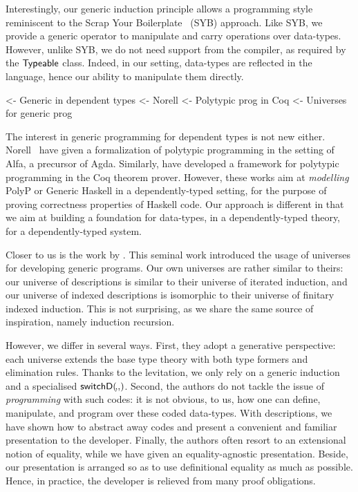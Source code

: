 Interestingly, our generic induction principle allows a programming
style reminiscent to the Scrap Your Boilerplate~\cite{spj:syb} (SYB)
approach. Like SYB, we provide a generic operator to manipulate and
carry operations over data-types. However, unlike SYB, we do not need
support from the compiler, as required by the $\textsf{Typeable}$
class. Indeed, in our setting, data-types are reflected in the
language, hence our ability to manipulate them directly.

\begin{wstructure}
    <- Generic in dependent types
        <- Norell \cite{norell:msc-thesis}
        <- Polytypic prog in Coq \cite{verbruggen:polytype-coq}
        <- Universes for generic prog \cite{benke:universe-generic-prog}
\end{wstructure}

The interest in generic programming for dependent types is not new
either. Norell~\cite{norell:msc-thesis} have given a formalization of
polytypic programming in the setting of Alfa, a precursor of
Agda. Similarly, \citet{verbruggen:polytype-prog-coq,
  verbruggen:polytype-coq} have developed a framework for polytypic
programming in the Coq theorem prover. However, these works aim at
\emph{modelling} PolyP or Generic Haskell in a dependently-typed
setting, for the purpose of proving correctness properties of Haskell
code. Our approach is different in that we aim at building a
foundation for data-types, in a dependently-typed theory, for a
dependently-typed system.

Closer to us is the work by \citet{benke:universe-generic-prog}. This
seminal work introduced the usage of universes for developing generic
programs. Our own universes are rather similar to theirs: our universe
of descriptions is similar to their universe of iterated induction,
and our universe of indexed descriptions is isomorphic to their
universe of finitary indexed induction. This is not surprising, as we
share the same source of inspiration, namely induction recursion.

However, we differ in several ways. First, they adopt a generative
perspective: each universe extends the base type theory with both type
formers and elimination rules. Thanks to the levitation, we only rely
on a generic induction and a specialised
$\switchD{\!}{\!}{\!}$. Second, the authors do not tackle the issue of
\emph{programming} with such codes: it is not obvious, to us, how one
can define, manipulate, and program over these coded data-types. With
descriptions, we have shown how to abstract away codes and present a
convenient and familiar presentation to the developer. Finally, the
authors often resort to an extensional notion of equality, while we
have given an equality-agnostic presentation. Beside, our presentation
is arranged so as to use definitional equality as much as
possible. Hence, in practice, the developer is relieved from many
proof obligations.
